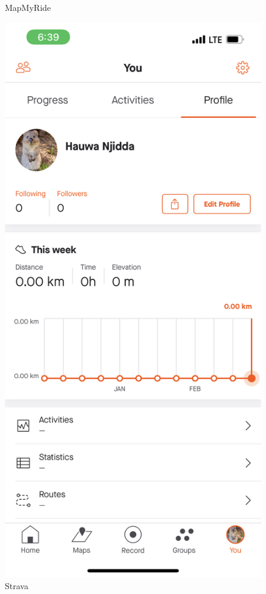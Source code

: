\documentclass{l4proj}
\begin{document}
\begin{figure}
\begin{minipage}[b]{0.3\textwidth}
  \caption{MapMyRide}
 \end{minipage}
 \begin{minipage}[b]{0.3\textwidth}
  \includegraphics[width=1\textwidth]{images/STAR.PNG}
  \caption{Strava}
 \end{minipage}
 
\end{figure}
\end{document}

